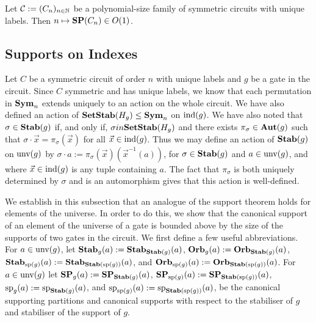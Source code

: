 \documentclass[../paper.tex]{subfiles}
\begin{document}
\begin{cor}
  Let $\mathcal{C} := (C_n)_{n \in \mathbb{N}}$ be a polynomial-size family of
  symmetric circuits with unique labels. Then $n \mapsto \text{\textbf{SP}}(C_n) \in O(1)$.
  \label{cor:constant-size-support}
\end{cor}



\subsection{Supports on Indexes}
Let $C$ be a symmetric circuit of order $n$ with unique labels and $g$ be a gate
in the circuit. Since $C$ symmetric and has unique labels, we know that each
permutation in $\text{\textbf{Sym}}_n$ extends uniquely to an action on the whole circuit. We
have also defined an action of $\text{\textbf{SetStab}}(H_g) \leq \text{\textbf{Sym}}_n$ on $\text{\upshape ind}(g)$. We have
also noted that $\sigma \in \text{\textbf{Stab}}(g)$ if, and only if, $\sigma in \text{\textbf{SetStab}}(H_g)$
and there exists $\pi_{\sigma} \in \text{\textbf{Aut}}(g)$ such that $\sigma \cdot \vec{x} =
\pi_{\sigma} (\vec{x})$ for all $\vec{x} \in \text{\upshape ind}(g)$. Thus we may define an
action of $\text{\textbf{Stab}}(g)$ on $\text{unv}(g)$ by $\sigma \cdot a := \pi_{\sigma}
(\vec{x}) (\vec{x}^{-1}(a))$, for $\sigma \in \text{\textbf{Stab}}(g)$ and $a \in
\text{unv}(g)$, and where $\vec{x} \in \text{\upshape ind}(g)$ is any tuple containing $a$. The
fact that $\pi_{\sigma}$ is both uniquely determined by $\sigma$ and is an
automorphism gives that this action is well-defined.

We establish in this subsection that an analogue of the support theorem holds
for elements of the universe. In order to do this, we show that the canonical
support of an element of the universe of a gate is bounded above by the size of
the supports of two gates in the circuit. We first define a few useful
abbreviations. For $a \in \text{unv}(g)$, let $\text{\textbf{Stab}}_{g}(a) :=
\text{\textbf{Stab}}_{\text{\textbf{Stab}}(g)}(a)$, $\text{\textbf{Orb}}_{g}(a) := \text{\textbf{Orb}}_{\text{\textbf{Stab}}(g)}(a)$, $\text{\textbf{Stab}}_{\text{sp}(g)}(a)
:= \text{\textbf{Stab}}_{\text{\textbf{Stab}}(\text{sp}(g))}(a)$, and $\text{\textbf{Orb}}_{\text{sp}(g)}(a) :=
\text{\textbf{Orb}}_{\text{\textbf{Stab}}(\text{sp}(g))}(a)$. For $a \in \text{unv}(g)$ let $\text{\textbf{SP}}_g(a) :=
\text{\textbf{SP}}_{\text{\textbf{Stab}}(g)}(a)$, $\text{\textbf{SP}}_{\text{sp}(g)}(a) := \text{\textbf{SP}}_{\text{\textbf{Stab}} (\text{sp} (g))}(a)$, $\text{sp}_g(a) :=
\text{sp}_{\text{\textbf{Stab}}(g)}(a)$, and $\text{sp}_{\text{sp}(g)}(a) := \text{sp}_{\text{\textbf{Stab}} (\text{sp} (g))}(a)$, be
the canonical supporting partitions and canonical supports with respect to the
stabiliser of $g$ and stabiliser of the support of $g$.
\end{document}
